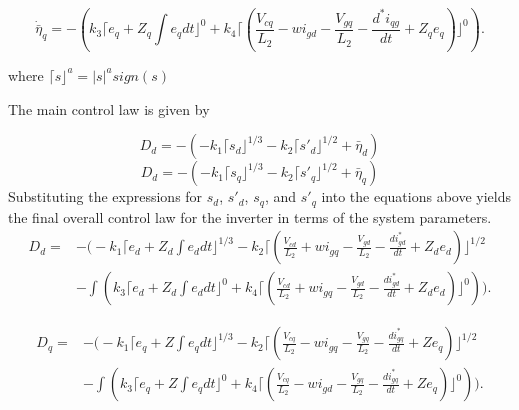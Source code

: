 \documentclass[preprint,12pt]{elsarticle}
\begin{document}
\begin{equation}
    \dot{\bar{\eta}}_{q} = -\left( k_3 \lceil  e_q + Z_q \int e_q dt \rfloor^0 + k_4 \lceil \left(
\frac{V_{cq}}{L_2} - w i_{gd} - \frac{V_{gq}}{L_2} - \frac{d^*i_{qg}}{dt} + Z_q e_q
\right) \rfloor^0 \right).
\end{equation}

where \(\lceil s \rfloor^a = |s|^a {sign}(s)\)

The main control law is given by

\begin{equation}
    D_d = -\left(-k_1 \lceil s_d \rfloor^{1/3} - k_2 \lceil {s'_d} \rfloor^{1/2} + \bar{\eta}_d \right)
\end{equation}
\begin{equation}
    D_d = -\left(-k_1 \lceil s_q \rfloor^{1/3} - k_2 \lceil {s'_q} \rfloor^{1/2} + \bar{\eta}_q \right)
\end{equation}
Substituting the expressions for \(s_d\), \(s'_d\), \(s_q\), and \(s'_q\) into the equations above yields the final overall control law for the inverter in terms of the system parameters.
{\footnotesize
\begin{equation}
\begin{aligned}
    D_d = & -\Bigg(-k_1 \lceil e_d + Z_d \int e_d dt \rfloor^{1/3} 
    - k_2 \Bigg\lceil \left(\frac{V_{cd}}{L_2} + w i_{gq} - \frac{V_{gd}}{L_2} 
    - \frac{di^*_{gd}}{dt} + Z_d e_d \right) \Bigg\rfloor^{1/2} \\
    & -\int\left( k_3 \lceil e_d + Z_d \int e_d dt \rfloor^0 
    + k_4 \Bigg\lceil \left(\frac{V_{cd}}{L_2} + w i_{gq} - \frac{V_{gd}}{L_2} 
    - \frac{di^*_{gd}}{dt} + Z_d e_d \right) \Bigg\rfloor^0 \right) \Bigg).
\end{aligned}
\end{equation}
}

{\small
\begin{equation}
 \begin{aligned}
    D_q = & -\Bigg(-k_1 \lceil e_q + Z \int e_q dt \rfloor^{1/3} 
    - k_2 \Bigg\lceil \left(\frac{V_{cq}}{L_2} - w i_{gq} - \frac{V_{gq}}{L_2} 
    - \frac{di^*_{gq}}{dt} + Z e_q \right) \Bigg\rfloor^{1/2} \\
    & -\int\left( k_3 \lceil e_q + Z \int e_q dt \rfloor^0 
    + k_4 \Bigg\lceil \left(\frac{V_{cq}}{L_2} - w i_{gd} - \frac{V_{gq}}{L_2} 
    - \frac{di^*_{gq}}{dt} + Z e_q \right) \Bigg\rfloor^0 \right) \Bigg).
 \end{aligned}
\end{equation}
}
\end{document}
